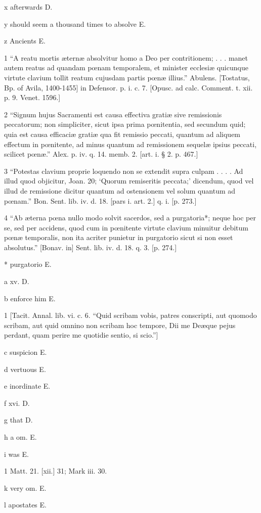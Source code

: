 x
afterwards D.

y
should seem a thousand times to absolve E.

z
Ancients E.

1
“A reatu mortis æternæ absolvitur homo a Deo per contritionem; . . . manet autem reatus ad quandam pœnam temporalem, et minister ecclesiæ quicunque virtute clavium tollit reatum cujusdam partis pœnæ illius.” Abulens. [Tostatus, Bp. of Avila, 1400-1455] in Defensor. p. i. c. 7. [Opusc. ad calc. Comment. t. xii. p. 9. Venet. 1596.]

2
“Signum hujus Sacramenti est causa effectiva gratiæ sive remissionis peccatorum; non simpliciter, sicut ipsa prima pœnitentia, sed secundum quid; quia est causa efficaciæ gratiæ qua fit remissio peccati, quantum ad aliquem effectum in pœnitente, ad minus quantum ad remissionem sequelæ ipsius peccati, scilicet pœnæ.” Alex. p. iv. q. 14. memb. 2. [art. i. § 2. p. 467.]

3
“Potestas clavium proprie loquendo non se extendit supra culpam . . . . Ad illud quod objicitur, Joan. 20; ‘Quorum remiseritis peccata;’ dicendum, quod vel illud de remissione dicitur quantum ad ostensionem vel solum quantum ad pœnam.” Bon. Sent. lib. iv. d. 18. [pars i. art. 2.] q. i. [p. 273.]

4
“Ab æterna pœna nullo modo solvit sacerdos, sed a purgatoria*; neque hoc per se, sed per accidens, quod cum in pœnitente virtute clavium minuitur debitum pœnæ temporalis, non ita acriter punietur in purgatorio sicut si non esset absolutus.” [Bonav. in] Sent. lib. iv. d. 18. q. 3. [p. 274.]

*
purgatorio E.

a
xv. D.

b
enforce him E.

1
[Tacit. Annal. lib. vi. c. 6. “Quid scribam vobis, patres conscripti, aut quomodo scribam, aut quid omnino non scribam hoc tempore, Dii me Deæque pejus perdant, quam perire me quotidie sentio, si scio.”]

c
suspicion E.

d
vertuous E.

e
inordinate E.

f
xvi. D.

g
that D.

h
a om. E.

i
was E.

1
Matt. 21. [xii.] 31; Mark iii. 30.

k
very om. E.

l
apostates E.

